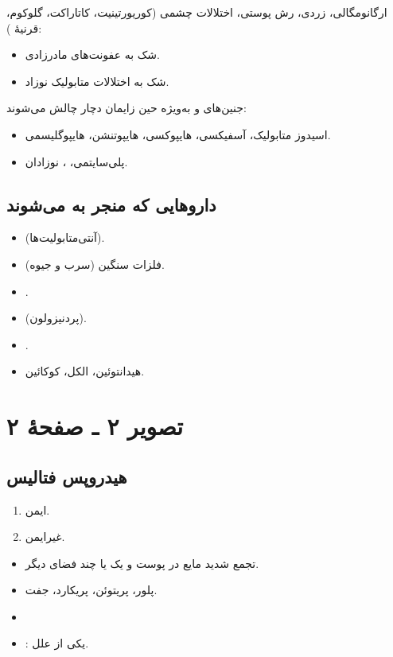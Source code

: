 \documentclass[12pt,a4paper]{article}
\begin{document}
ارگانومگالی، زردی، رش پوستی، اختلالات چشمی
(کوریورتینیت، کاتاراکت، گلوکوم، قرنیهٔ ):
\begin{itemize}
  \item شک به عفونت‌های مادرزادی.
  \item شک به اختلالات متابولیک نوزاد.
\end{itemize}

جنین‌های  و  به‌ویژه حین زایمان دچار چالش می‌شوند:
\begin{itemize}
  \item اسیدوز متابولیک، آسفیکسی، هایپوکسی، هایپوتنشن، هایپوگلیسمی.
  \item پلی‌سایتمی، ،  نوزادان.
\end{itemize}


\subsection*{داروهایی که منجر به  می‌شوند}
\begin{itemize}
  \item {} (آنتی‌متابولیت‌ها).
  \item فلزات سنگین (سرب و جیوه).
  \item {}.
  \item {} (پردنیزولون).
  \item {}.
  \item هیدانتوئین، الکل، کوکائین.
\end{itemize}

\clearpage
\section*{تصویر ۲ ـ صفحهٔ ۲}
\subsection*{هیدروپس فتالیس}
\begin{enumerate}
  \item ایمن.
  \item غیرایمن.
\end{enumerate}
\begin{itemize}
  \item تجمع شدید مایع در پوست و یک یا چند فضای دیگر.
  \item پلور، پریتوئن، پریکارد، جفت.
  \item {}
  \item {}: یکی از علل.
\end{itemize}
\end{document}
